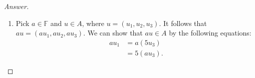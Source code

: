 \begin{proof}[Answer]
\begin{enumerate}[label=(\alph*)]
\begin{enumerate}[label=(\roman*)]
\begin{equation*}
\begin{split}
u_1+w_1 &= 5u_3+5w_3\\
&=5(u_1+w_3)
\end{split}
\end{equation*}
\item Pick $a\in \mathbb{F}$ and $u\in A$, where $u=(u_1,u_2,u_3)$. It follows that $au=(au_1,au_2,au_3)$. We can show that $au\in A$ by the following equations:
\begin{equation*}
\begin{split}
au_1&=a(5u_3)\\
&=5(au_3).
\end{split}
\end{equation*}
\end{enumerate}
\end{enumerate}
\end{proof}


